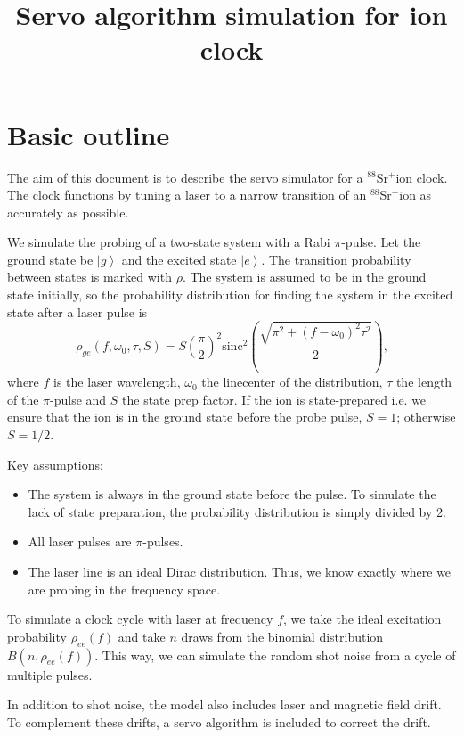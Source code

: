 \documentclass[a4paper,12pt]{article}
\title{Servo algorithm simulation for \sr ion clock}
\newcommand{\sr}{$^{88}$Sr$^+$}
\newcommand{\ket}[1]{\left| #1 \right\rangle}
\begin{document}
\maketitle

\section{Basic outline}

The aim of this document is to describe the servo simulator for a \sr ion clock.
The clock functions by tuning a laser to a narrow transition of an \sr ion 
as accurately as possible.

We simulate the probing of a two-state system with a Rabi $\pi$-pulse.
Let the ground state be $\ket{g}$ and the excited state $\ket{e}$.
The transition probability between states is marked with $\rho$.  
The system is assumed to be in the ground state initially, so the probability
distribution for finding the system in the excited state after a laser pulse is
\begin{equation}
    \rho_{ge}(f, \omega_0, \tau, S) = S \left( \frac{\pi}{2} \right)^2 \textrm{sinc}^2 
    \left( \frac{\sqrt{\pi^2 + (f-\omega_0)^2 \tau^2}}{2} \right) \text{,}
\end{equation}
where $f$ is the laser wavelength, $\omega_0$ the linecenter of the distribution,
$\tau$ the length of the $\pi$-pulse and $S$ the state prep factor.
If the ion is state-prepared i.e. we ensure that the ion is in the ground state
before the probe pulse, $S=1$; otherwise $S=1/2$.

Key assumptions:
\begin{itemize}
    \item The system is always in the ground state before the pulse.
    To simulate the lack of state preparation, the probability distribution
    is simply divided by 2.
    \item All laser pulses are $\pi$-pulses.
    \item The laser line is an ideal Dirac distribution.
    Thus, we know exactly where we are probing in the frequency space.
\end{itemize}

To simulate a clock cycle with laser at frequency $f$, we take the ideal excitation
probability $\rho_{ee}(f)$ and take $n$ draws from the binomial distribution
$B(n, \rho_{ee}(f))$.
This way, we can simulate the random shot noise from a cycle of multiple pulses.

In addition to shot noise, the model also includes laser and magnetic field
drift.
To complement these drifts, a servo algorithm is included to correct the
drift.
\end{document}
